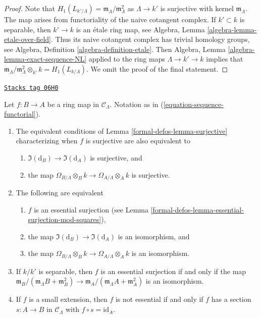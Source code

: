 \begin{proof}
Note that $H_1(L_{k'/\Lambda}) = \mathfrak m_\Lambda/\mathfrak m_\Lambda^2$
as $\Lambda \to k'$ is surjective with kernel $\mathfrak m_\Lambda$.
The map arises from functoriality of the naive cotangent complex.
If $k' \subset k$ is separable, then $k' \to k$ is an \'etale ring map, see
Algebra, Lemma \ref{algebra-lemma-etale-over-field}.
Thus its naive cotangent complex has trivial homology groups, see
Algebra, Definition \ref{algebra-definition-etale}.
Then
Algebra, Lemma \ref{algebra-lemma-exact-sequence-NL}
applied to the ring maps $\Lambda \to k' \to k$ implies that
$\mathfrak m_\Lambda/\mathfrak m_\Lambda^2 \otimes_{k'} k = H_1(L_{k/\Lambda})$.
We omit the proof of the final statement.
\end{proof}

\begin{lemma}
\label{formal-defos-lemma-essential-surjection}
\href{https://stacks.math.columbia.edu/tag/06H0}{\texttt{Stacks tag 06H0}}

Let $f: B \to A$ be a ring map in $\mathcal{C}_\Lambda$.
Notation as in (\ref{equation-sequence-functorial}).
\begin{enumerate}
\item The equivalent conditions of
Lemma \ref{formal-defos-lemma-surjective}
characterizing when $f$ is surjective are also equivalent to
\begin{enumerate}
\item $\Im(\text{d}_B) \to \Im(\text{d}_A)$ is surjective, and
\item the map $\Omega_{B/\Lambda} \otimes_B k \to
\Omega_{A/\Lambda} \otimes_A k$ is surjective.
\end{enumerate}
\item The following are equivalent
\begin{enumerate}
\item $f$ is an essential surjection
(see Lemma \ref{formal-defos-lemma-essential-surjection-mod-squares}),
\item the map $\Im(\text{d}_B) \to \Im(\text{d}_A)$ is an
isomorphism, and
\item the map $\Omega_{B/\Lambda} \otimes_B k \to
\Omega_{A/\Lambda} \otimes_A k$ is an isomorphism.
\end{enumerate}
\item If $k/k'$ is separable, then $f$ is an essential surjection if
and only if the map
$\mathfrak m_B/(\mathfrak m_\Lambda B + \mathfrak m_B^2) \to
\mathfrak m_A/(\mathfrak m_\Lambda A + \mathfrak m_A^2)$
is an isomorphism.
\item If $f$ is a small extension, then $f$ is not essential if and only if
$f$ has a section $s: A \to B$ in $\mathcal{C}_\Lambda$
with $f \circ s = \text{id}_A$.
\end{enumerate}
\end{lemma}


